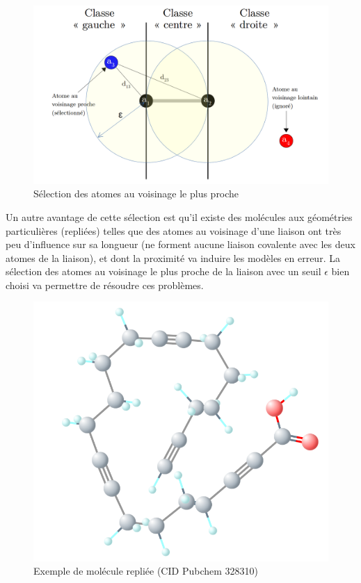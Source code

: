 \begin{figure}[!h]
	\centering
	\includegraphics[scale=0.28]{images/classes_pos_3.png}
	\caption{Sélection des atomes au voisinage le plus proche}
\end{figure}

\par Un autre avantage de cette sélection est qu'il existe des molécules aux géométries particulières (repliées) telles que des atomes au voisinage d'une liaison ont très peu d'influence sur sa longueur (ne forment aucune liaison covalente avec les deux atomes de la liaison), et dont la proximité va induire les modèles en erreur. La sélection des atomes au voisinage le plus proche de la liaison avec un seuil $\epsilon$ bien choisi va permettre de résoudre ces problèmes.

\begin{figure}[!h]
	\centering
	
	\includegraphics[scale=0.25]{images/mol_repliee.png}
	\caption{Exemple de molécule repliée (CID Pubchem 328310)}
\end{figure}